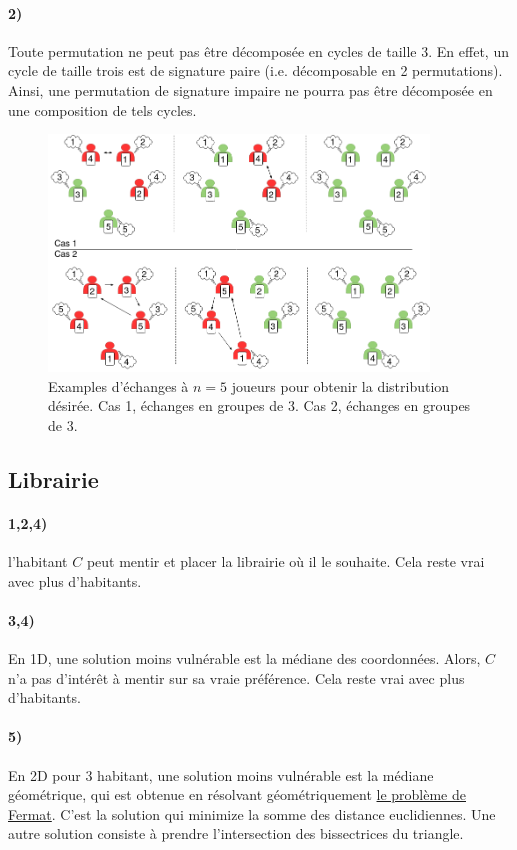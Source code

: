 \documentclass[a4paper,10pt,oneside]{article}
\begin{document}
\paragraph*{2)} 
Toute permutation ne peut pas être décomposée en cycles de taille 3. 
En effet, un cycle de taille trois est de signature paire (i.e. décomposable en 2 permutations).
Ainsi, une permutation de signature impaire ne pourra pas être décomposée en une composition de tels cycles.


\begin{figure}[!ht]
  \centering
  \includegraphics[width=0.9\textwidth]{figures/indice_traders.png}
  \caption{Examples d'échanges à $n=5$ joueurs pour obtenir la distribution désirée. Cas 1, échanges en groupes de 3. Cas 2, échanges en groupes de 3.}
\end{figure}


\subsection{Librairie}

\paragraph*{1,2,4)} 
l'habitant $C$ peut mentir et placer la librairie où il le souhaite. Cela reste vrai avec plus d'habitants.

\paragraph*{3,4)} 
En 1D, une solution moins vulnérable est la médiane des coordonnées. 
Alors, $C$ n'a pas d'intérêt à mentir sur sa vraie préférence. Cela reste vrai avec plus d'habitants.

\paragraph*{5)} 
En 2D pour 3 habitant, une solution moins vulnérable est la médiane géométrique, qui est obtenue en résolvant géométriquement \href{https://fr.wikipedia.org/wiki/Probl%C3%A8me_de_Weber}{le problème de Fermat}. 
C'est la solution qui minimize la somme des distance euclidiennes.
Une autre solution consiste à prendre l'intersection des bissectrices du triangle.
\end{document}
